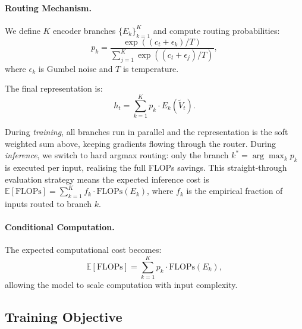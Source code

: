 \documentclass{article}
\begin{document}
\paragraph{Routing Mechanism.}
We define $K$ encoder branches $\{E_k\}_{k=1}^{K}$ and compute routing probabilities:
\begin{equation}
p_k = \frac{\exp((c_t + \epsilon_k)/T)}{\sum_{j=1}^{K} \exp((c_t + \epsilon_j)/T)},
\end{equation}
where $\epsilon_k$ is Gumbel noise and $T$ is temperature.

The final representation is:
\begin{equation}
h_t = \sum_{k=1}^{K} p_k \cdot E_k(\tilde{V}_t).
\end{equation}

During \emph{training}, all branches run in parallel and the representation is the soft weighted sum above, keeping gradients flowing through the router. During \emph{inference}, we switch to hard argmax routing: only the branch $k^* = \arg\max_k p_k$ is executed per input, realising the full FLOPs savings. This straight-through evaluation strategy means the expected inference cost is $\mathbb{E}[\text{FLOPs}] = \sum_{k=1}^{K} f_k \cdot \text{FLOPs}(E_k)$, where $f_k$ is the empirical fraction of inputs routed to branch $k$.

\paragraph{Conditional Computation.}
The expected computational cost becomes:
\begin{equation}
\mathbb{E}[\text{FLOPs}] = \sum_{k=1}^{K} p_k \cdot \text{FLOPs}(E_k),
\end{equation}
allowing the model to scale computation with input complexity.

\subsection{Training Objective}
\end{document}
